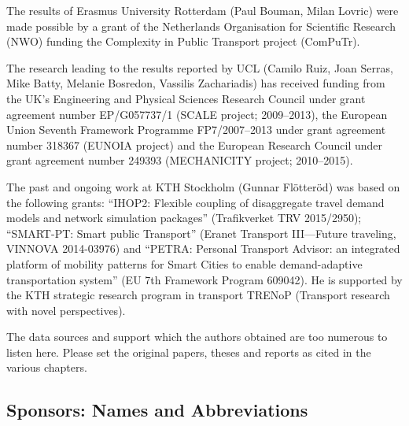 The results of Erasmus University Rotterdam (Paul Bouman, Milan Lovric) were made possible by a grant of the Netherlands Organisation for Scientific Research (NWO) funding the Complexity in Public Transport project (ComPuTr). 

The research leading to the results reported by UCL (Camilo Ruiz, Joan Serras, Mike Batty, Melanie Bosredon, Vassilis Zachariadis) has received funding from the UK's Engineering and Physical Sciences Research Council under grant agreement number EP/G057737/1 (SCALE project; 2009–2013), the European Union Seventh Framework Programme FP7/2007–2013 under grant agreement number 318367 (EUNOIA project) and the European Research Council under grant agreement number 249393 (MECHANICITY project; 2010–2015).

The past and ongoing work at KTH Stockholm (Gunnar Flötteröd) was based on the
following grants:
``IHOP2: Flexible coupling of disaggregate travel demand models and network simulation packages'' (Trafikverket TRV 2015/2950); 
``SMART-PT: Smart public Transport'' (Eranet Transport III---Future traveling, VINNOVA 2014-03976) and
``PETRA: Personal Transport Advisor: an integrated platform of mobility patterns for Smart Cities to enable demand-adaptive transportation system'' (EU 7th Framework Program 609042). 
He is supported by the KTH strategic research program in transport TRENoP (Transport research with novel perspectives).

The data sources and support which the authors obtained are too numerous to listen here. Please set the original papers, theses and reports as cited in the various chapters. 

\subsection*{Sponsors: Names and Abbreviations}


